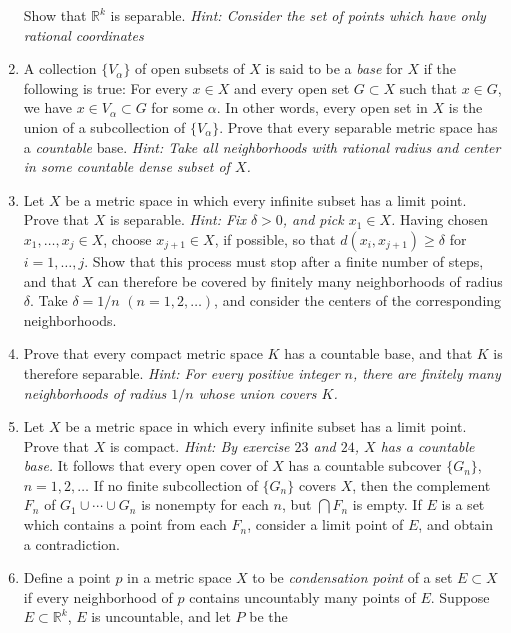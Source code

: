 \begin{enumerate}
  Show that \(\mathbb{R}^k\) is separable.
  \textit{Hint: Consider the set of points which have only rational
    coordinates}
\item
  A collection \(\{V_{\alpha}\}\) of open subsets of \(X\) is said to be a
  \textit{base} for \(X\) if the following is true: For every \(x\in X\) and
  every open set \(G\subset X\) such that \(x\in G\), we have
  \(x\in V_{\alpha}\subset G\) for some \(\alpha\).
  In other words, every open set in \(X\) is the union of a subcollection of
  \(\{V_{\alpha}\}\).
  Prove that every separable metric space has a \textit{countable} base.
  \textit{Hint: Take all neighborhoods with rational radius and center in some
    countable dense subset of \(X\).}
\item
  Let \(X\) be a metric space in which every infinite subset has a limit point.
  Prove that \(X\) is separable.
  \textit{Hint: Fix \(\delta > 0\), and pick \(x_1\in X\).}
  Having chosen \(x_1,\ldots,x_j\in X\), choose \(x_{j + 1}\in X\), if
  possible, so that \(d(x_i, x_{j + 1})\geq\delta\) for \(i = 1,\ldots,j\).
  Show that this process must stop after a finite number of steps, and that
  \(X\) can therefore be covered by finitely many neighborhoods of radius
  \(\delta\).
  Take \(\delta = 1/n\) \((n = 1,2,\ldots)\), and consider the centers of the
  corresponding neighborhoods.
\item
  Prove that every compact metric space \(K\) has a countable base, and that
  \(K\) is therefore separable.
  \textit{Hint: For every positive integer \(n\), there are finitely many
    neighborhoods of radius \(1/n\) whose union covers \(K\).}
\item
  Let \(X\) be a metric space in which every infinite subset has a limit point.
  Prove that \(X\) is compact.
  \textit{Hint: By exercise \(23\) and \(24\), \(X\) has a countable base.}
  It follows that every open cover of \(X\) has a countable subcover
  \(\{G_n\}\), \(n = 1,2,\ldots\)
  If no finite subcollection of \(\{G_n\}\) covers \(X\), then the complement
  \(F_n\) of \(G_1\cup\cdots\cup G_n\) is nonempty for each \(n\), but
  \(\bigcap F_n\) is empty.
  If \(E\) is a set which contains a point from each \(F_n\), consider a limit
  point of \(E\), and obtain a contradiction.
\item
  Define a point \(p\) in a metric space \(X\) to be
  \textit{condensation point} of a set \(E\subset X\) if every neighborhood of
  \(p\) contains uncountably many points of \(E\).
  Suppose \(E\subset\mathbb{R}^k\), \(E\) is uncountable, and let \(P\) be the

\end{enumerate}
